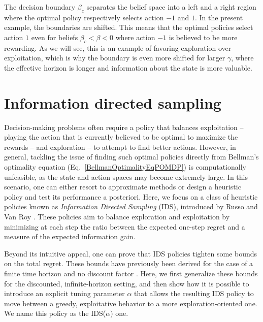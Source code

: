 \documentclass[aps,nofootinbib,groupaddress,superscriptaddress,reprint,amsmath,amssymb,graphicx,onecolumn,prx]{revtex4-2}
\begin{document}
The decision boundary $\beta_c$ separates the belief space into a left and a right region where the optimal policy respectively selects action $-1$ and $1$. In the present example, the boundaries are shifted. This means that the optimal policies select action $1$ even for beliefs $\beta_c<\beta<0$ where action $-1$ is believed to be more rewarding. As we will see, this is an example of favoring exploration over exploitation, which is why the boundary is even more shifted for larger $\gamma$, where the effective horizon is longer and information about the state is more valuable.


\section{Information directed sampling}
\noindent Decision-making problems often require a policy that balances exploitation -- playing the action that is currently believed to be optimal to maximize the rewards -- and exploration -- to attempt to find better actions. However, in general, tackling the issue of finding such optimal policies directly from Bellman's optimality equation (Eq.~\eqref{BellmanOptimalityEqPOMDP}) is computationally unfeasible, as the state and action spaces may become extremely large. In this scenario, one can either resort to approximate methods or design a heuristic policy and test its performance a posteriori. Here, we focus on a class of heuristic policies known as \textit{Information Directed Sampling} (IDS), introduced by Russo and Van Roy \cite{russo2014learning}. These policies aim to balance exploration and exploitation by minimizing at each step the ratio between the expected one-step regret and a measure of the expected information gain. 

Beyond its intuitive appeal, one can prove that IDS policies tighten some bounds on the total regret. These bounds have previously been derived for the case of a finite time horizon and no discount factor \cite{russo2014learning,min_information-theoretic_2023}. Here,  we first generalize these bounds for the discounted, infinite-horizon setting, and then show how it is possible to introduce an explicit tuning parameter $\alpha$ that allows the resulting IDS policy to move between a greedy, exploitative behavior to a more exploration-oriented one. We name this policy as the IDS($\alpha$) one.
\end{document}
